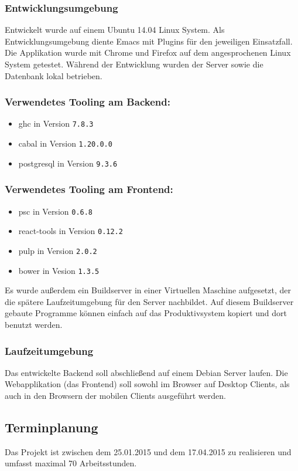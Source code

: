 \subsubsection{Entwicklungsumgebung}
Entwickelt wurde auf einem Ubuntu 14.04 Linux System. Als
Entwicklungsumgebung diente Emacs mit Plugins für den jeweiligen
Einsatzfall. Die Applikation wurde mit Chrome und Firefox auf dem
angesprochenen Linux System getestet. Während der Entwicklung wurden
der Server sowie die Datenbank lokal betrieben.
\subsubsection*{Verwendetes Tooling am Backend:}
\begin{itemize}
\item \gls{ghc} in Version \texttt{7.8.3}
\item \gls{cabal} in Version \texttt{1.20.0.0}
\item \gls{postgresql} in Version \texttt{9.3.6}
\end{itemize}

\subsubsection*{Verwendetes Tooling am Frontend:}
\begin{itemize}
\item \gls{psc} in Version \texttt{0.6.8}
\item \gls{react-tools} in Version \texttt{0.12.2}
\item \gls{pulp} in Version \texttt{2.0.2}
\item \gls{bower} in Vesion \texttt{1.3.5}
\end{itemize}
Es wurde außerdem ein Buildserver in einer Virtuellen Maschine
aufgesetzt, der die spätere Laufzeitumgebung für den Server
nachbildet. Auf diesem Buildserver gebaute Programme können einfach
auf das Produktivsystem kopiert und dort benutzt werden.
\subsubsection{Laufzeitumgebung}
Das entwickelte Backend soll abschließend auf einem Debian Server
laufen. Die Webapplikation (das Frontend) soll sowohl im Browser auf
Desktop Clients, als auch in den Browsern der mobilen Clients
ausgeführt werden.
\subsection{Terminplanung}
Das Projekt ist zwischen dem 25.01.2015 und dem 17.04.2015 zu
realisieren und umfasst maximal 70 Arbeitsstunden.

